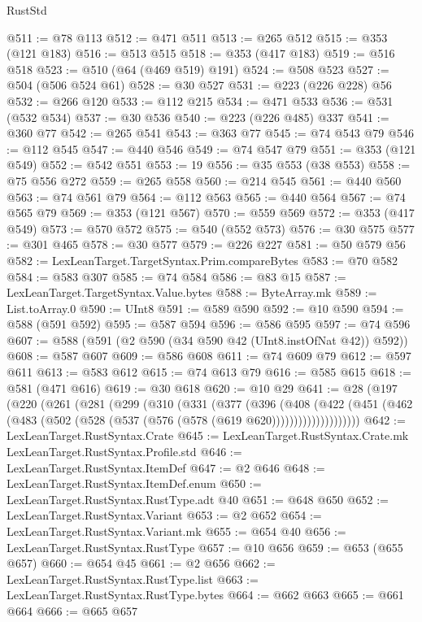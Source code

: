 \begin{lexlean}{RustStd}
\begin{coremodule}
@511 := @78 @113
@512 := @471 @511
@513 := @265 @512
@515 := @353 (@121 @183)
@516 := @513 @515
@518 := @353 (@417 @183)
@519 := @516 @518
@523 := @510 (@64 (@469 @519) @191)
@524 := @508 @523
@527 := @504 (@506 @524 @61)
@528 := @30 @527
@531 := @223 (@226 @228) @56
@532 := @266 @120
@533 := @112 @215
@534 := @471 @533
@536 := @531 (@532 @534)
@537 := @30 @536
@540 := @223 (@226 @485) @337
@541 := @360 @77
@542 := @265 @541
@543 := @363 @77
@545 := @74 @543 @79
@546 := @112 @545
@547 := @440 @546
@549 := @74 @547 @79
@551 := @353 (@121 @549)
@552 := @542 @551
@553 := 19
@556 := @35 @553 (@38 @553)
@558 := @75 @556 @272
@559 := @265 @558
@560 := @214 @545
@561 := @440 @560
@563 := @74 @561 @79
@564 := @112 @563
@565 := @440 @564
@567 := @74 @565 @79
@569 := @353 (@121 @567)
@570 := @559 @569
@572 := @353 (@417 @549)
@573 := @570 @572
@575 := @540 (@552 @573)
@576 := @30 @575
@577 := @301 @465
@578 := @30 @577
@579 := @226 @227
@581 := @50 @579 @56
@582 := LexLeanTarget.TargetSyntax.Prim.compareBytes
@583 := @70 @582
@584 := @583 @307
@585 := @74 @584
@586 := @83 @15
@587 := LexLeanTarget.TargetSyntax.Value.bytes
@588 := ByteArray.mk
@589 := List.toArray.{0}
@590 := UInt8
@591 := @589 @590
@592 := @10 @590
@594 := @588 (@591 @592)
@595 := @587 @594
@596 := @586 @595
@597 := @74 @596
@607 := @588 (@591 (@2 @590 (@34 @590 @42 (UInt8.instOfNat @42)) @592))
@608 := @587 @607
@609 := @586 @608
@611 := @74 @609 @79
@612 := @597 @611
@613 := @583 @612
@615 := @74 @613 @79
@616 := @585 @615
@618 := @581 (@471 @616)
@619 := @30 @618
@620 := @10 @29
@641 := @28
    (@197
      (@220
        (@261
          (@281
            (@299
              (@310
                (@331
                  (@377
                    (@396
                      (@408
                        (@422
                          (@451
                            (@462 (@483 (@502 (@528 (@537 (@576 (@578 (@619 @620))))))))))))))))))))
@642 := LexLeanTarget.RustSyntax.Crate
@645 := LexLeanTarget.RustSyntax.Crate.mk LexLeanTarget.RustSyntax.Profile.std
@646 := LexLeanTarget.RustSyntax.ItemDef
@647 := @2 @646
@648 := LexLeanTarget.RustSyntax.ItemDef.enum
@650 := LexLeanTarget.RustSyntax.RustType.adt @40
@651 := @648 @650
@652 := LexLeanTarget.RustSyntax.Variant
@653 := @2 @652
@654 := LexLeanTarget.RustSyntax.Variant.mk
@655 := @654 @40
@656 := LexLeanTarget.RustSyntax.RustType
@657 := @10 @656
@659 := @653 (@655 @657)
@660 := @654 @45
@661 := @2 @656
@662 := LexLeanTarget.RustSyntax.RustType.list
@663 := LexLeanTarget.RustSyntax.RustType.bytes
@664 := @662 @663
@665 := @661 @664
@666 := @665 @657

\end{coremodule}
\end{lexlean}
